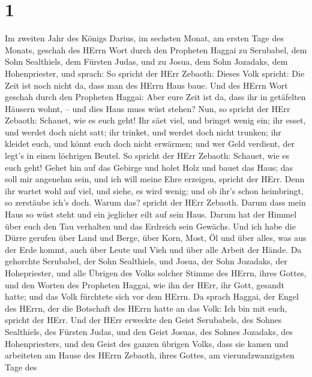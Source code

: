 \hypertarget{section}{%
\section{1}\label{section}}

 Im zweiten Jahr des Königs Darius, im sechsten Monat, am
ersten Tage des Monats, geschah des HErrn Wort durch den Propheten
Haggai zu Serubabel, dem Sohn Sealthiels, dem Fürsten Judas, und zu
Josua, dem Sohn Jozadaks, dem Hohenpriester, und sprach:  So
spricht der HErr Zebaoth: Dieses Volk spricht: Die Zeit ist noch nicht
da, dass man des HErrn Haus baue.  Und des HErrn Wort
geschah durch den Propheten Haggai:  Aber eure Zeit ist da,
dass ihr in getäfelten Häusern wohnt, -- und dies Haus muss wüst stehen?
 Nun, so spricht der HErr Zebaoth: Schauet, wie es euch
geht!  Ihr säet viel, und bringet wenig ein; ihr esset, und
werdet doch nicht satt; ihr trinket, und werdet doch nicht trunken; ihr
kleidet euch, und könnt euch doch nicht erwärmen; und wer Geld verdient,
der legt's in einen löchrigen Beutel.  So spricht der HErr
Zebaoth: Schauet, wie es euch geht!  Gehet hin auf das
Gebirge und holet Holz und bauet das Haus; das soll mir angenehm sein,
und ich will meine Ehre erzeigen, spricht der HErr.  Denn
ihr wartet wohl auf viel, und siehe, es wird wenig; und ob ihr's schon
heimbringt, so zerstäube ich's doch. Warum das? spricht der HErr
Zebaoth. Darum dass mein Haus so wüst steht und ein jeglicher eilt auf
sein Haus.  Darum hat der Himmel über euch den Tau
verhalten und das Erdreich sein Gewächs.  Und ich habe die
Dürre gerufen über Land und Berge, über Korn, Most, Öl und über alles,
was aus der Erde kommt, auch über Leute und Vieh und über alle Arbeit
der Hände.  Da gehorchte Serubabel, der Sohn Sealthiels,
und Josua, der Sohn Jozadaks, der Hohepriester, und alle Übrigen des
Volks solcher Stimme des HErrn, ihres Gottes, und den Worten des
Propheten Haggai, wie ihn der HErr, ihr Gott, gesandt hatte; und das
Volk fürchtete sich vor dem HErrn.  Da sprach Haggai, der
Engel des HErrn, der die Botschaft des HErrn hatte an das Volk: Ich bin
mit euch, spricht der HErr.  Und der HErr erweckte den
Geist Serubabels, des Sohnes Sealthiels, des Fürsten Judas, und den
Geist Josuas, des Sohnes Jozadaks, des Hohenpriesters, und den Geist des
ganzen übrigen Volks, dass sie kamen und arbeiteten am Hause des HErrn
Zebaoth, ihres Gottes,  am vierundzwanzigsten Tage des
